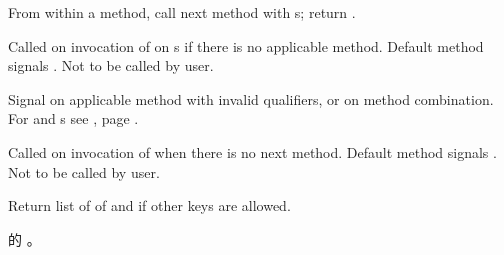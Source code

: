 \begin{LIST}{1cm}
  {
    From within a method, call next method with s; return
    .
  }

  {
    Called on invocation of  on s if
    there is no applicable method.  Default method signals
    .  Not to be called by user.
  }

  {
    Signal  on applicable method with invalid qualifiers, or
    on method combination. For  and s see
    , page \pageref{section:Format}.
  }

  {
    Called on invocation of  when there is no next
    method.  Default method signals .  Not to be called by
    user.
  }

  {
    Return list of  of  and
    \retvalii{\T} if other keys are allowed.
  }

  {
     的 。
  }


\end{LIST}

